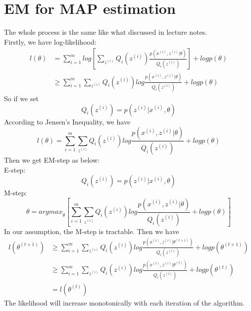 \documentclass[12pt]{article}
\begin{document}
    \section*{EM for MAP estimation}
    The whole process is the same like what discussed in lecture notes. \\
    Firstly, we have log-likelihood:
    \begin{equation*}
        \begin{split}
            l(\theta) &= \sum_{i=1}^m log[\sum_{z^{(i)}}Q_i(z^{(i)})\frac{p(x^{(i)},z^{(i)}|\theta)}{Q_i(z^{(i)})}] + logp(\theta) \\
            &\geq \sum_{i=1}^m \sum_{z^{(i)}}Q_i(z^{(i)})log\frac{p(x^{(i)},z^{(i)}|\theta)}{Q_i(z^{(i)})} + logp(\theta)
        \end{split}
    \end{equation*}
    So if we set$$Q_i(z^{(i)})=p(z^{(i)}|x^{(i)},\theta)$$
    According to Jensen's Inequality, we have
    $$l(\theta)=\sum_{i=1}^m \sum_{z^{(i)}}Q_i(z^{(i)})log\frac{p(x^{(i)},z^{(i)}|\theta)}{Q_i(z^{(i)})} + logp(\theta)$$
    Then we get EM-step as below: \\
    E-step:$$Q_i(z^{(i)})=p(z^{(i)}|x^{(i)},\theta)$$
    M-step:$$\theta={argmax}_{\theta}[\sum_{i=1}^m \sum_{z^{(i)}}Q_i(z^{(i)})log\frac{p(x^{(i)},z^{(i)}|\theta)}{Q_i(z^{(i)})} + logp(\theta)]$$
    In our assumption, the M-step is tractable. Then we have
    \begin{equation*}
        \begin{split}
            l(\theta^{(t+1)}) 
            &\geq \sum_{i=1}^m \sum_{z^{(i)}}Q_i(z^{(i)})log\frac{p(x^{(i)},z^{(i)}|\theta^{(t+1)})}{Q_i(z^{(i)})} + logp(\theta^{(t+1)}) \\
            &\geq \sum_{i=1}^m \sum_{z^{(i)}}Q_i(z^{(i)})log\frac{p(x^{(i)},z^{(i)}|\theta^{(t)})}{Q_i(z^{(i)})} + logp(\theta^{(t)}) \\
            &= l(\theta^{(t)}) 
        \end{split}
    \end{equation*}
    The likelihood will increase monotonically with each iteration of the algorithm.

    \newpage
\end{document}
